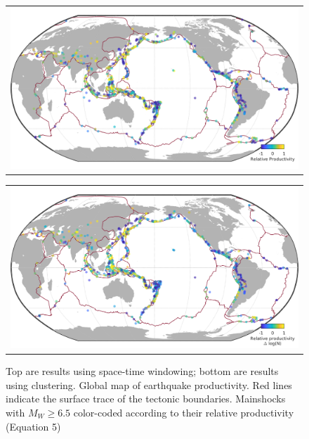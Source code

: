 \documentclass[draft]{agujournal}
\begin{document}
\newpage
\begin{figure}[H]
    \centering
    \begin{tabular}{@{}c@{}}
        \includegraphics[width = \linewidth]{figures/worldmap_res.png}
    \end{tabular}
    
    \begin{tabular}{@{}c@{}}
        \includegraphics[width = \linewidth]{figures/worldmap_res_z2008.png}
    \end{tabular}
    
    \caption{Top are results using space-time windowing; bottom are results using \citet{Zaliapin2008} clustering. Global map of earthquake productivity. Red lines indicate the surface trace of the tectonic boundaries. Mainshocks with $M_W\ge6.5$ color-coded according to their relative productivity (Equation 5)}
\end{figure}
\end{document}

